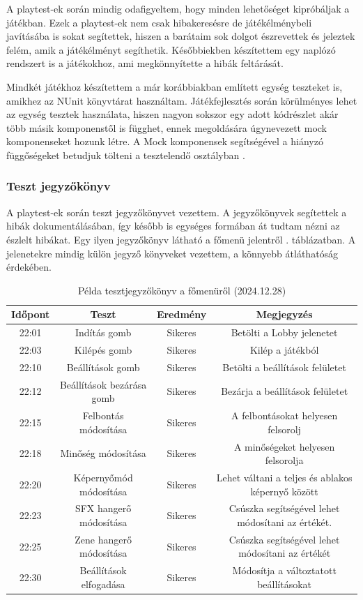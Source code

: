 \documentclass[]{thesis-ekf}
\theoremstyle{definition}
\theoremstyle{remark}
\begin{document}
A playtest-ek során mindig odafigyeltem, hogy minden lehetőséget kipróbáljak a játékban. Ezek a playtest-ek nem csak hibakeresésre de játékélménybeli javításába is sokat segítettek, hiszen a barátaim sok dolgot észrevettek és jeleztek felém, amik a játékélményt segíthetik. Későbbiekben készítettem egy naplózó rendszert is a játékokhoz, ami megkönnyítette a hibák feltárását.

Mindkét játékhoz készítettem a már korábbiakban említett egység teszteket is, amikhez az NUnit könyvtárat használtam. Játékfejlesztés során körülményes lehet az egység tesztek használata, hiszen nagyon sokszor egy adott kódrészlet akár több másik komponenstől is függhet, ennek megoldására úgynevezett mock komponenseket hozunk létre. A Mock komponensek segítségével a hiányzó függőségeket betudjuk tölteni a tesztelendő osztályban \cite{NUnit}.

\subsubsection{Teszt jegyzőkönyv}

A playtest-ek során teszt jegyzőkönyvet vezettem. A jegyzőkönyvek segítettek a hibák dokumentálásában, így később is egységes formában át tudtam nézni az észlelt hibákat. Egy ilyen jegyzőkönyv látható a főmenü jelentről . táblázatban. A jelenetekre mindig külön jegyző könyveket vezettem, a könnyebb átláthatóság érdekében.

\begin{table}[ht!]
	\centering
	\footnotesize
	\begin{tabular}{|c|c|c|c|}
		\hline
		\textbf{Időpont} & \textbf{Teszt} & \textbf{Eredmény} & \textbf{Megjegyzés} \\
		\hline
		22:01 & Indítás gomb & Sikeres & Betölti a Lobby jelenetet \\
        \hline
		22:03 & Kilépés gomb & Sikeres & Kilép a játékból \\
		\hline
		22:10 & Beállítások gomb & Sikeres & Betölti a beállítások felületet \\
		\hline
		22:12 & Beállítások bezárása gomb & Sikeres & Bezárja a beállítások felületet \\
		\hline
		22:15 & Felbontás módosítása & Sikeres & A felbontásokat helyesen felsorolj \\
		\hline
		22:18 & Minőség módosítása & Sikeres & A minőségeket helyesen felsorolja \\
		\hline
		22:20 & Képernyőmód módosítása & Sikeres & Lehet váltani a teljes és ablakos képernyő között \\
		\hline
		22:23 & SFX hangerő módosítása & Sikeres & Csúszka segítségével lehet módosítani az értékét. \\
		\hline
		22:25 & Zene hangerő módosítása & Sikeres & Csúszka segítségével lehet módosítani az értékét \\
		\hline
		22:30 & Beállítások elfogadása & Sikeres & Módosítja a változtatott beállításokat \\
		\hline
	\end{tabular}
	\caption{Példa tesztjegyzőkönyv a főmenüről (2024.12.28)}
	\label{tab-tesztjegyzokonyv}
\end{table}
\end{document}
